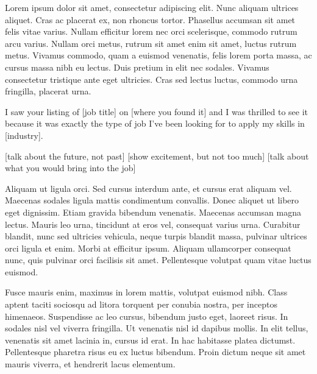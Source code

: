 Lorem ipsum dolor sit amet, consectetur adipiscing elit. Nunc aliquam ultrices aliquet. Cras ac placerat ex, non rhoncus tortor. Phasellus accumsan sit amet felis vitae varius. Nullam efficitur lorem nec orci scelerisque, commodo rutrum arcu varius. Nullam orci metus, rutrum sit amet enim sit amet, luctus rutrum metus. Vivamus commodo, quam a euismod venenatis, felis lorem porta massa, ac cursus massa nibh eu lectus. Duis pretium in elit nec sodales. Vivamus consectetur tristique ante eget ultricies. Cras sed lectus luctus, commodo urna fringilla, placerat urna.

I saw your listing of [job title] on [where you found it] and I was thrilled to see it because it was exactly the type of job I've been looking for to apply my skills in [industry].

[talk about the future, not past]
[show excitement, but not too much]
[talk about what you would bring into the job]

Aliquam ut ligula orci. Sed cursus interdum ante, et cursus erat aliquam vel. Maecenas sodales ligula mattis condimentum convallis. Donec aliquet ut libero eget dignissim. Etiam gravida bibendum venenatis. Maecenas accumsan magna lectus. Mauris leo urna, tincidunt at eros vel, consequat varius urna. Curabitur blandit, nunc sed ultricies vehicula, neque turpis blandit massa, pulvinar ultrices orci ligula et enim. Morbi at efficitur ipsum. Aliquam ullamcorper consequat nunc, quis pulvinar orci facilisis sit amet. Pellentesque volutpat quam vitae luctus euismod.

Fusce mauris enim, maximus in lorem mattis, volutpat euismod nibh. Class aptent taciti sociosqu ad litora torquent per conubia nostra, per inceptos himenaeos. Suspendisse ac leo cursus, bibendum justo eget, laoreet risus. In sodales nisl vel viverra fringilla. Ut venenatis nisl id dapibus mollis. In elit tellus, venenatis sit amet lacinia in, cursus id erat. In hac habitasse platea dictumst. Pellentesque pharetra risus eu ex luctus bibendum. Proin dictum neque sit amet mauris viverra, et hendrerit lacus elementum. 